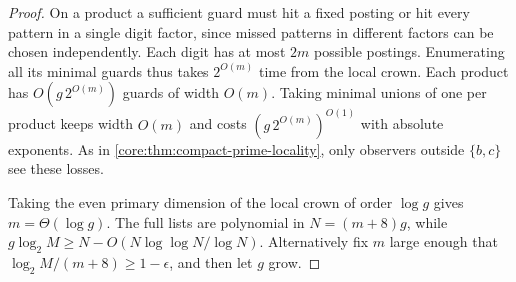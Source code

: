 \begin{proof}
On a product a sufficient guard must hit a fixed posting or hit
every pattern in a single digit factor, since missed patterns in
different factors can be chosen independently. Each digit has at
most $2m$ possible postings. Enumerating all its minimal guards
thus takes $2^{O(m)}$ time from the local crown. Each product has
$O(g\,2^{O(m)})$ guards of width $O(m)$. Taking minimal unions of
one per product keeps width $O(m)$ and costs $(g\,2^{O(m)})^{O(1)}$
with absolute exponents. As in \cref{core:thm:compact-prime-locality},
only observers outside $\{b,c\}$ see these losses.

Taking the even primary dimension of the local crown of order
$\log g$ gives $m=\Theta(\log g)$. The full lists are polynomial
in $N=(m+8)g$, while $g\log_2 M\ge N-O(N\log\log N/\log N)$.
Alternatively fix $m$ large enough that
$\log_2 M/(m+8)\ge1-\epsilon$, and then let $g$ grow.
\end{proof}

